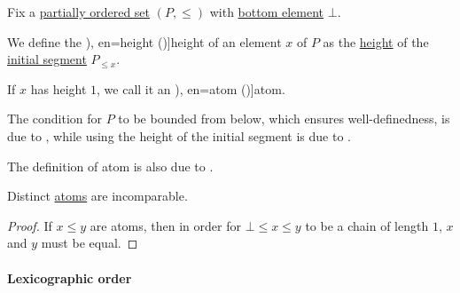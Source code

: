 \begin{definition}\label{def:partial_order_element_height}\mimprovised
  Fix a \hyperref[def:partially_ordered_set]{partially ordered set} \( (P, \leq) \) with \hyperref[def:extremal_points/top_and_bottom]{bottom element} \( \bot \).

  We define the \term[ru=высота (\cite[83]{Гуров2013ТеорияРешёток}), en=height (\cite[5]{Birkhoff1967LatticeTheory})]{height} of an element \( x \) of \( P \) as the \hyperref[def:partial_order_chain/height]{height} of the \hyperref[def:order_interval/unbounded]{initial segment} \( P_{\leq x} \).

  If \( x \) has height \( 1 \), we call it an \term[ru=атом (\cite[89]{Гуров2013ТеорияРешёток}), en=atom (\cite[5]{Birkhoff1967LatticeTheory})]{atom}.
\end{definition}
\begin{comments}
  \item The condition for \( P \) to be bounded from below, which ensures well-definedness, is due to , while using the height of the initial segment is due to .

  \item The definition of atom is also due to .
\end{comments}

\begin{proposition}\label{thm:atoms_are_incomparable}
  Distinct \hyperref[def:partial_order_element_height]{atoms} are incomparable.
\end{proposition}
\begin{proof}
  If \( x \leq y \) are atoms, then in order for \( \bot \leq x \leq y \) to be a chain of length \( 1 \), \( x \) and \( y \) must be equal.
\end{proof}

\paragraph{Lexicographic order}

